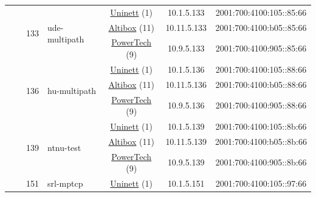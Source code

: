 \begin{small}
\begin{center}
\begin{longtable}{|c|c|c|c|c|c|c|c|}
  &  & \multirow{3}{*}{\tiny{133}} & \multicolumn{1}{|l|}{\multirow{3}{*}{\tiny{ude-multipath}}} & \multicolumn{2}{|c|}{\tiny{\href{https://www.uninett.no}{Uninett} (1)}} & \tiny{10.1.5.133} & \tiny{2001:700:4100:105::85:66} \\* \cline{5-5}\cline{6-6}\cline{7-7}\cline{8-8}
  &  &  &  & \multicolumn{2}{|c|}{\tiny{\href{https://www.altibox.no}{Altibox} (11)}} & \tiny{10.11.5.133} & \tiny{2001:700:4100:b05::85:66} \\* \cline{5-5}\cline{6-6}\cline{7-7}\cline{8-8}
  &  &  &  & \multicolumn{2}{|c|}{\tiny{\href{http://www.powertech.no}{PowerTech} (9)}} & \tiny{10.9.5.133} & \tiny{2001:700:4100:905::85:66} \\* \cline{3-3}\cline{4-4}\cline{5-5}\cline{6-6}\cline{7-7}\cline{8-8}
  &  & \multirow{3}{*}{\tiny{136}} & \multicolumn{1}{|l|}{\multirow{3}{*}{\tiny{hu-multipath}}} & \multicolumn{2}{|c|}{\tiny{\href{https://www.uninett.no}{Uninett} (1)}} & \tiny{10.1.5.136} & \tiny{2001:700:4100:105::88:66} \\* \cline{5-5}\cline{6-6}\cline{7-7}\cline{8-8}
  &  &  &  & \multicolumn{2}{|c|}{\tiny{\href{https://www.altibox.no}{Altibox} (11)}} & \tiny{10.11.5.136} & \tiny{2001:700:4100:b05::88:66} \\* \cline{5-5}\cline{6-6}\cline{7-7}\cline{8-8}
  &  &  &  & \multicolumn{2}{|c|}{\tiny{\href{http://www.powertech.no}{PowerTech} (9)}} & \tiny{10.9.5.136} & \tiny{2001:700:4100:905::88:66} \\* \cline{3-3}\cline{4-4}\cline{5-5}\cline{6-6}\cline{7-7}\cline{8-8}
  &  & \multirow{3}{*}{\tiny{139}} & \multicolumn{1}{|l|}{\multirow{3}{*}{\tiny{ntnu-test}}} & \multicolumn{2}{|c|}{\tiny{\href{https://www.uninett.no}{Uninett} (1)}} & \tiny{10.1.5.139} & \tiny{2001:700:4100:105::8b:66} \\* \cline{5-5}\cline{6-6}\cline{7-7}\cline{8-8}
  &  &  &  & \multicolumn{2}{|c|}{\tiny{\href{https://www.altibox.no}{Altibox} (11)}} & \tiny{10.11.5.139} & \tiny{2001:700:4100:b05::8b:66} \\* \cline{5-5}\cline{6-6}\cline{7-7}\cline{8-8}
  &  &  &  & \multicolumn{2}{|c|}{\tiny{\href{http://www.powertech.no}{PowerTech} (9)}} & \tiny{10.9.5.139} & \tiny{2001:700:4100:905::8b:66} \\* \cline{3-3}\cline{4-4}\cline{5-5}\cline{6-6}\cline{7-7}\cline{8-8}
  &  & \multirow{3}{*}{\tiny{151}} & \multicolumn{1}{|l|}{\multirow{3}{*}{\tiny{srl-mptcp}}} & \multicolumn{2}{|c|}{\tiny{\href{https://www.uninett.no}{Uninett} (1)}} & \tiny{10.1.5.151} & \tiny{2001:700:4100:105::97:66} \\* \cline{5-5}\cline{6-6}\cline{7-7}\cline{8-8}

\end{longtable}
\end{center}
\end{small}
